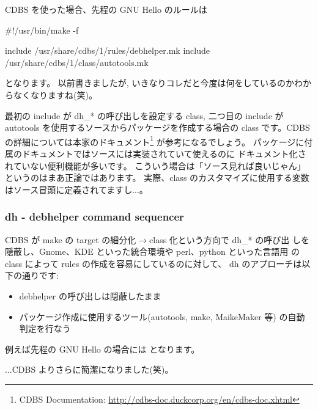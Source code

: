\documentclass[mingoth,a4paper]{jsarticle}
\begin{document}
CDBS を使った場合、先程の GNU Hello のルールは
\begin{commandline}
#!/usr/bin/make -f

include /usr/share/cdbs/1/rules/debhelper.mk
include /usr/share/cdbs/1/class/autotools.mk
\end{commandline}
となります。
以前書きましたが, %
いきなりコレだと今度は何をしているのかわからなくなりますね(笑)。

最初の include が dh\_* の呼び出しを設定する class, 
二つ目の include が autotools を使用するソースからパッケージを作成する場合の
class です。CDBS の詳細については本家のドキュメント\footnote{%
CDBS Documentation: \url{http://cdbs-doc.duckcorp.org/en/cdbs-doc.xhtml}}
が参考になるでしょう。
%
パッケージに付属のドキュメントではソースには実装されていて使えるのに
ドキュメント化されていない便利機能が多いです。
%
こういう場合は「ソース見れば良いじゃん」というのはまあ正論ではあります。%
実際、class のカスタマイズに使用する変数はソース冒頭に定義されてますし...。


\subsubsection{dh - debhelper command sequencer}

CDBS が make の target の細分化$\to$class 化という方向で dh\_* の呼び出
しを隠蔽し、Gnome、KDE といった統合環境や perl、python といった言語用
の class によって rules の作成を容易にしているのに対して、
dh のアプローチは以下の通りです:
\begin{itemize}
      \item debhelper の呼び出しは隠蔽したまま
      \item 
    パッケージ作成に使用するツール(autotools, make, MaikeMaker 等)
    の自動判定を行なう
\end{itemize}


例えば先程の GNU Hello の場合には
となります。
...CDBS よりさらに簡潔になりました(笑)。
\end{document}
